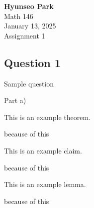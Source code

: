 \documentclass[10pt]{article}
\begin{document}
\begin{center}
    \textbf{Hyunseo Park} \\
    Math 146 \\
    January 13, 2025 \\
    Assignment 1
\end{center}


\begin{center} 
    \section*{Question 1}
\end{center}

\blueline

\vspace{0.3cm}

\begin{enumerate}[{$[$}1{$]$}]
    \item Sample question
    \begin{enumerate}[{$[$}a{$]$}]
        \item Part a)
    \end{enumerate}
\end{enumerate}

\blueline


\begin{center}
    \begin{theorem}
        This is an example theorem.
    \end{theorem}
    \begin{proofb}
        because of this
    \end{proofb}
\end{center}

\blueline

\begin{center}
    \begin{claim}
        This is an example claim.
    \end{claim}
    \begin{proofb}
        because of this
    \end{proofb}
\end{center}

\blueline

\begin{center}
    \begin{lemma}
        This is an example lemma.
    \end{lemma}
    \begin{proofb}
        because of this 
    \end{proofb}
\end{center}
\end{document}
